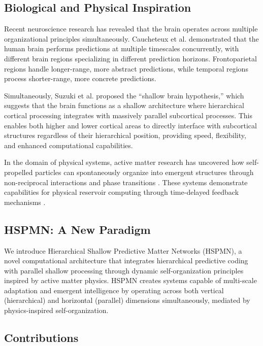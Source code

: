 \documentclass[11pt,a4paper,twocolumn]{article}
\begin{document}
\subsection{Biological and Physical Inspiration}

Recent neuroscience research has revealed that the brain operates across multiple organizational principles simultaneously. Caucheteux et al. \cite{caucheteux2023evidence} demonstrated that the human brain performs predictions at multiple timescales concurrently, with different brain regions specializing in different prediction horizons. Frontoparietal regions handle longer-range, more abstract predictions, while temporal regions process shorter-range, more concrete predictions.

Simultaneously, Suzuki et al. \cite{suzuki2023shallow} proposed the ``shallow brain hypothesis,'' which suggests that the brain functions as a shallow architecture where hierarchical cortical processing integrates with massively parallel subcortical processes. This enables both higher and lower cortical areas to directly interface with subcortical structures regardless of their hierarchical position, providing speed, flexibility, and enhanced computational capabilities.

In the domain of physical systems, active matter research has uncovered how self-propelled particles can spontaneously organize into emergent structures through non-reciprocal interactions and phase transitions \cite{marchetti2024active}. These systems demonstrate capabilities for physical reservoir computing through time-delayed feedback mechanisms \cite{cichos2025roadmap}.

\subsection{HSPMN: A New Paradigm}

We introduce Hierarchical Shallow Predictive Matter Networks (HSPMN), a novel computational architecture that integrates hierarchical predictive coding with parallel shallow processing through dynamic self-organization principles inspired by active matter physics. HSPMN creates systems capable of multi-scale adaptation and emergent intelligence by operating across both vertical (hierarchical) and horizontal (parallel) dimensions simultaneously, mediated by physics-inspired self-organization.

\subsection{Contributions}
\end{document}
